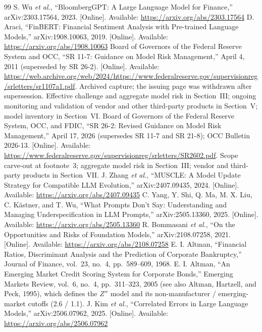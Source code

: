 \documentclass{ieeeaccess}
\begin{document}
\begin{thebibliography}{99}
\small
{} S. Wu \emph{et al.}, ``BloombergGPT: A Large Language Model for Finance,'' arXiv:2303.17564, 2023. [Online]. Available: \url{https://arxiv.org/abs/2303.17564}
 D. Araci, ``FinBERT: Financial Sentiment Analysis with Pre-trained Language Models,'' arXiv:1908.10063, 2019. [Online]. Available: \url{https://arxiv.org/abs/1908.10063}
 Board of Governors of the Federal Reserve System and OCC, ``SR 11-7: Guidance on Model Risk Management,'' April 4, 2011 (superseded by SR 26-2). [Online]. Available: \url{https://web.archive.org/web/2024/https://www.federalreserve.gov/supervisionreg/srletters/sr1107a1.pdf}. Archived capture; the issuing page was withdrawn after supersession. Effective challenge and aggregate model risk in Section~III; ongoing monitoring and validation of vendor and other third-party products in Section~V; model inventory in Section~VI.
 Board of Governors of the Federal Reserve System, OCC, and FDIC, ``SR 26-2: Revised Guidance on Model Risk Management,'' April 17, 2026 (supersedes SR 11-7 and SR 21-8); OCC Bulletin 2026-13. [Online]. Available: \url{https://www.federalreserve.gov/supervisionreg/srletters/SR2602.pdf}. Scope carve-out at footnote~3; aggregate model risk in Section~III; vendor and third-party products in Section~VII.
 J. Zhang \emph{et al.}, ``MUSCLE: A Model Update Strategy for Compatible LLM Evolution,'' arXiv:2407.09435, 2024. [Online]. Available: \url{https://arxiv.org/abs/2407.09435}
 C. Yang, Y. Shi, Q. Ma, M. X. Liu, C. K\"astner, and T. Wu, ``What Prompts Don't Say: Understanding and Managing Underspecification in LLM Prompts,'' arXiv:2505.13360, 2025. [Online]. Available: \url{https://arxiv.org/abs/2505.13360}
 R. Bommasani \emph{et al.}, ``On the Opportunities and Risks of Foundation Models,'' arXiv:2108.07258, 2021. [Online]. Available: \url{https://arxiv.org/abs/2108.07258}
 E. I. Altman, ``Financial Ratios, Discriminant Analysis and the Prediction of Corporate Bankruptcy,'' Journal of Finance, vol.~23, no.~4, pp.~589--609, 1968.
 E. I. Altman, ``An Emerging Market Credit Scoring System for Corporate Bonds,'' Emerging Markets Review, vol.~6, no.~4, pp.~311--323, 2005 (see also Altman, Hartzell, and Peck, 1995), which defines the $Z''$ model and its non-manufacturer / emerging-market cutoffs (2.6 / 1.1).
 J. Kim \emph{et al.}, ``Correlated Errors in Large Language Models,'' arXiv:2506.07962, 2025. [Online]. Available: \url{https://arxiv.org/abs/2506.07962}

\end{thebibliography}
\end{document}
